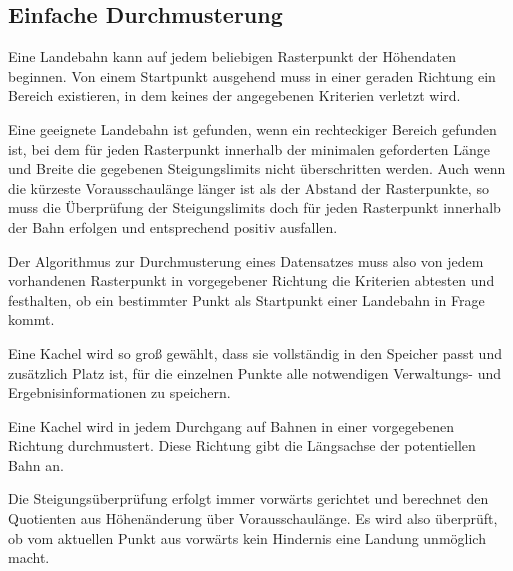 \documentclass[
11pt, %
a4paper, %
oneside, %
pdfspacing, %
headinclude,
BCOR5mm, %
ngerman, %
bibtotocnumbered,
]{scrartcl}
\begin{document}
\subsection{Einfache Durchmusterung}
Eine Landebahn kann auf jedem beliebigen Rasterpunkt der Höhendaten beginnen. Von einem Startpunkt ausgehend muss in einer geraden Richtung ein Bereich existieren, in dem keines der angegebenen Kriterien verletzt wird. 

Eine geeignete Landebahn ist gefunden, wenn ein rechteckiger Bereich gefunden ist, bei dem für jeden Rasterpunkt innerhalb der minimalen geforderten Länge und Breite die gegebenen Steigungslimits nicht überschritten werden.
Auch wenn die kürzeste Vorausschaulänge länger ist als der Abstand der Rasterpunkte, so muss die Überprüfung der Steigungslimits doch für jeden Rasterpunkt innerhalb der Bahn erfolgen und entsprechend positiv ausfallen.

Der Algorithmus zur Durchmusterung eines Datensatzes muss also von jedem vorhandenen Rasterpunkt in vorgegebener Richtung die Kriterien abtesten und festhalten, ob ein bestimmter Punkt als Startpunkt einer Landebahn in Frage kommt.

Eine Kachel wird so groß gewählt, dass sie vollständig in den Speicher passt und zusätzlich Platz ist, für die einzelnen Punkte alle notwendigen Verwaltungs- und Ergebnisinformationen zu speichern.

Eine Kachel wird in jedem Durchgang auf Bahnen in einer vorgegebenen Richtung durchmustert. Diese Richtung gibt die Längsachse der potentiellen Bahn an.

Die Steigungsüberprüfung erfolgt immer vorwärts gerichtet und berechnet den Quotienten aus Höhenänderung über Vorausschaulänge. Es wird also überprüft, ob vom aktuellen Punkt aus vorwärts kein Hindernis eine Landung unmöglich macht.
\end{document}
